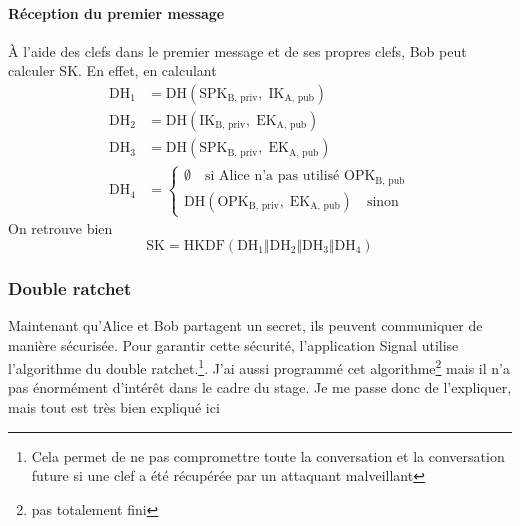 \documentclass[a4paper, 12pt]{article}
\begin{document}
\paragraph{Réception du premier message}
À l'aide des clefs dans le premier message et de ses propres clefs, Bob peut calculer SK. En effet, en calculant 
\begin{align*}
	\text{DH}_1 &= \hyperref[DH]{\text{DH}}\left(\text{SPK}_{\text{B, priv}}, \;\text{IK}_{\text{A, pub}}\right)\\
	\text{DH}_2 &= \hyperref[DH]{\text{DH}}\left(\text{IK}_{\text{B, priv}}, \;\text{EK}_{\text{A, pub}}\right)\\
	\text{DH}_3 &= \hyperref[DH]{\text{DH}}\left(\text{SPK}_{\text{B, priv}}, \;\text{EK}_{\text{A, pub}}\right)\\
	\text{DH}_4 &= \begin{cases}\emptyset \quad\text{si Alice n'a pas utilisé $\text{OPK}_{\text{B, pub}}$}\\\hyperref[DH]{\text{DH}}\left(\text{OPK}_{\text{B, priv}}, \;\text{EK}_{\text{A, pub}}\right) \quad\text{sinon}\end{cases}
\end{align*}
On retrouve bien 
$$\text{SK} = \hyperref[HKDF]{\text{HKDF}}\left(\text{DH}_1\hyperref[concat]{\Vert}\text{DH}_2\hyperref[concat]{\Vert}\text{DH}_3\hyperref[concat]{\Vert}\text{DH}_4\right)$$


\subsubsection{Double ratchet}\label{doubleratchet}
Maintenant qu'Alice et Bob partagent un secret, ils peuvent communiquer de manière sécurisée. Pour garantir cette sécurité, l'application Signal utilise l'algorithme du double ratchet.\footnote{Cela permet de ne pas compromettre toute la conversation et la conversation future si une clef a été récupérée par un attaquant malveillant}. J'ai aussi programmé cet algorithme\footnote{pas totalement fini} mais il n'a pas énormément d'intérêt dans le cadre du stage. Je me passe donc de l'expliquer, mais tout est très bien expliqué ici \cite{doubleratchet}
\end{document}
